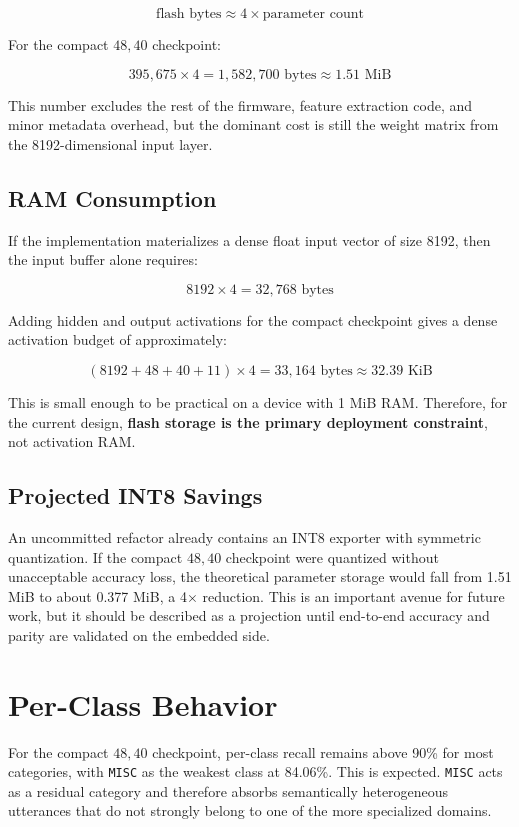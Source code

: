 \documentclass[11pt,a4paper]{article}
\begin{document}
\[
\text{flash bytes} \approx 4 \times \text{parameter count}
\]

For the compact \(48, 40\) checkpoint:

\[
395{,}675 \times 4 = 1{,}582{,}700 \text{ bytes} \approx 1.51 \text{ MiB}
\]

This number excludes the rest of the firmware, feature extraction code, and minor metadata overhead, but the dominant cost is still the weight matrix from the 8192-dimensional input layer.

\subsection{RAM Consumption}

If the implementation materializes a dense float input vector of size 8192, then the input buffer alone requires:

\[
8192 \times 4 = 32{,}768 \text{ bytes}
\]

Adding hidden and output activations for the compact checkpoint gives a dense activation budget of approximately:

\[
(8192 + 48 + 40 + 11)\times 4 = 33{,}164 \text{ bytes} \approx 32.39 \text{ KiB}
\]

This is small enough to be practical on a device with 1 MiB RAM. Therefore, for the current design, \textbf{flash storage is the primary deployment constraint}, not activation RAM.

\subsection{Projected INT8 Savings}

An uncommitted refactor already contains an INT8 exporter with symmetric quantization. If the compact \(48, 40\) checkpoint were quantized without unacceptable accuracy loss, the theoretical parameter storage would fall from 1.51 MiB to about 0.377 MiB, a 4\(\times\) reduction. This is an important avenue for future work, but it should be described as a projection until end-to-end accuracy and parity are validated on the embedded side.

\section{Per-Class Behavior}

For the compact \(48, 40\) checkpoint, per-class recall remains above 90\% for most categories, with \texttt{MISC} as the weakest class at 84.06\%. This is expected. \texttt{MISC} acts as a residual category and therefore absorbs semantically heterogeneous utterances that do not strongly belong to one of the more specialized domains.
\end{document}
